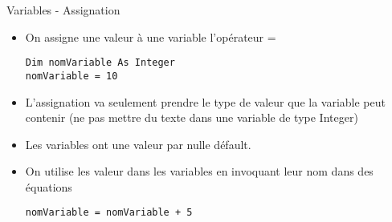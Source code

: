 \documentclass[aspectratio=169,usenames,dvipsnames]{beamer}
\begin{document}
    \begin{frame}[fragile]{Variables - Assignation}
        \begin{itemize}
            \item On assigne une valeur à une variable l’opérateur =
            \begin{lstlisting}
Dim nomVariable As Integer
nomVariable = 10
            \end{lstlisting}
            \item L’assignation va seulement prendre le type de valeur que la variable peut contenir (ne pas mettre du texte dans une variable de type Integer)
            \item Les variables ont une valeur par nulle défault.
            \item On utilise les valeur dans les variables en invoquant leur nom dans des équations
            \begin{lstlisting}
nomVariable = nomVariable + 5
            \end{lstlisting}
        \end{itemize}
    \end{frame}
\end{document}
